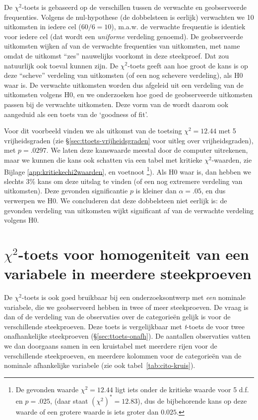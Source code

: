 \documentclass[
]{book}
\begin{document}
De \(\chi^2\)-toets is gebaseerd op de verschillen tussen de verwachte en geobserveerde
frequenties. Volgens de nul-hypothese (de dobbelsteen is eerlijk)
verwachten we 10 uitkomsten in iedere cel (\(60/6=10\)), m.a.w. de
verwachte frequentie is identiek voor iedere cel (dat wordt een \emph{uniforme} verdeling genoemd).
De geobserveerde
uitkomsten wijken af van de verwachte frequenties van uitkomsten, met
name omdat de uitkomst ``zes'' nauwelijks voorkomt in deze steekproef. Dat
zou natuurlijk ook toeval kunnen zijn. De \(\chi^2\)-toets geeft aan hoe groot de kans is
op deze ``scheve'' verdeling van uitkomsten (of een nog schevere verdeling), als H0 waar is.
De verwachte
uitkomsten worden dus afgeleid uit een verdeling van de uitkomsten
volgens H0, en we onderzoeken hoe goed de geobserveerde uitkomsten
passen bij de verwachte uitkomsten. Deze vorm van de wordt daarom ook
aangeduid als een toets van de `goodness of fit'.

Voor dit voorbeeld vinden we als uitkomst van de toetsing \(\chi^2=12.44\)
met 5 vrijheidsgraden (zie
§\ref{sec:ttoets-vrijheidsgraden} voor uitleg over
vrijheidsgraden), met \(p=.0297\). We laten deze kanswaarde meestal door de
computer uitrekenen, maar we kunnen die kans ook schatten via een tabel met kritieke \(\chi^2\)-waarden, zie Bijlage \ref{app:kritiekechi2waarden}, en voetnoot \footnote{De gevonden waarde \(\chi^2=12.44\) ligt iets onder de kritieke waarde voor 5 d.f. en \(p=.025\), (daar staat \((\chi^2)^*=12.83\)), dus de bijbehorende kans op deze waarde of een grotere waarde is iets groter dan \(0.025\).}).
Als H0 waar is, dan hebben we slechts 3\% kans om
deze uitslag te vinden (of een nog extremere verdeling van uitkomsten).
Deze gevonden significantie \(p\) is kleiner dan \(\alpha=.05\), en dus
verwerpen we H0. We concluderen dat deze dobbelsteen niet eerlijk is: de
gevonden verdeling van uitkomsten wijkt significant af van de verwachte
verdeling volgens H0.

\hypertarget{chi2-toets-voor-homogeniteit-van-een-variabele-in-meerdere-steekproeven}{%
\section{\texorpdfstring{\(\chi^2\)-toets voor homogeniteit van een variabele in meerdere steekproeven}{\textbackslash chi\^{}2-toets voor homogeniteit van een variabele in meerdere steekproeven}}\label{chi2-toets-voor-homogeniteit-van-een-variabele-in-meerdere-steekproeven}}

De \(\chi^2\)-toets is ook goed bruikbaar bij een onderzoeksontwerp met \emph{een} nominale
variabele, die we geobserveerd hebben in twee of meer steekproeven. De
vraag is dan of de verdeling van de observaties over de categorieën
gelijk is voor de verschillende steekproeven. Deze toets is
vergelijkbaar met \emph{t}-toets de voor twee onafhankelijke steekproeven
(§\ref{sec:ttoets-onafh}). De aantallen observaties vatten we dan
doorgaans samen in een kruistabel met meerdere rijen voor de
verschillende steekproeven, en meerdere kolommen voor de categorieën van
de nominale afhankelijke variabele (zie ook
tabel~\ref{tab:cito-kruis}).
\end{document}
